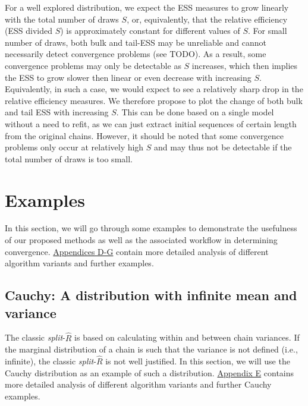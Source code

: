 \documentclass[american,]{article}
\begin{document}
For a well explored distribution, we expect the ESS measures to grow
linearly with the total number of draws \(S\), or, equivalently, that
the relative efficiency (ESS divided \(S\)) is approximately constant
for different values of \(S\). For small number of draws, both bulk and
tail-ESS may be unreliable and cannot necessarily detect convergence
problems (see TODO). As a result, some convergence problems may only be
detectable as \(S\) increases, which then implies the ESS to grow slower
then linear or even decrease with increasing \(S\). Equivalently, in
such a case, we would expect to see a relatively sharp drop in the
relative efficiency measures. We therefore propose to plot the change of
both bulk and tail ESS with increasing \(S\). This can be done based on
a single model without a need to refit, as we can just extract initial
sequences of certain length from the original chains. However, it should
be noted that some convergence problems only occur at relatively high
\(S\) and may thus not be detectable if the total number of draws is too
small.

\hypertarget{examples}{%
\section{Examples}\label{examples}}

In this section, we will go through some examples to demonstrate the
usefulness of our proposed methods as well as the associated workflow in
determining convergence. \protect\hyperlink{AppendixD}{Appendices D-G}
contain more detailed analysis of different algorithm variants and
further examples.

\hypertarget{cauchy-a-distribution-with-infinite-mean-and-variance}{%
\subsection{Cauchy: A distribution with infinite mean and
variance}\label{cauchy-a-distribution-with-infinite-mean-and-variance}}

The classic \emph{split}-\(\widehat{R}\) is based on calculating within
and between chain variances. If the marginal distribution of a chain is
such that the variance is not defined (i.e., infinite), the classic
\emph{split}-\(\widehat{R}\) is not well justified. In this section, we
will use the Cauchy distribution as an example of such a distribution.
\protect\hyperlink{AppendixE}{Appendix E} contains more detailed
analysis of different algorithm variants and further Cauchy examples.
\end{document}
